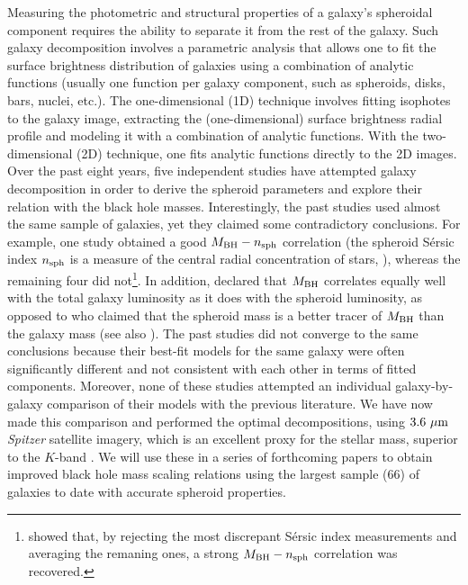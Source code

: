 \documentclass[preprint2]{emulateapj}
\begin{document}
Measuring the photometric and structural properties of a galaxy's spheroidal component 
requires the ability to separate it from the rest of the galaxy. 
Such galaxy decomposition involves a parametric analysis that allows one to fit the surface brightness distribution
of galaxies using a combination of analytic functions (usually one function per
galaxy component, such as spheroids, disks, bars, nuclei, etc.).
The one-dimensional (1D) technique involves fitting isophotes to the galaxy image, extracting the (one-dimensional) surface 
brightness radial profile and modeling it with a combination of analytic functions.
With the two-dimensional (2D) technique, one fits analytic functions directly to the 2D images. \\
Over the past eight years, five independent studies 
\citep{grahamdriver2007,sani2011,vika2012,beifiori2012,lasker2014data,lasker2014anal} have attempted galaxy decomposition
in order to derive the spheroid parameters and explore their relation with the black hole masses. 
Interestingly, the past studies used almost the same sample of galaxies, yet they claimed some contradictory conclusions.
For example, one study \citep{grahamdriver2007} obtained a good $M_{\rm BH}-n_{\rm sph}$ correlation 
(the spheroid S\'ersic index $n_{\rm sph}$ is a measure of the central radial concentration of stars, \citealt{trujillo2001}), 
whereas the remaining four did not\footnote{\cite{savorgnan2013} showed that, 
by rejecting the most discrepant S\'ersic index measurements and averaging the remaning ones, 
a strong $M_{\rm BH}-n_{\rm sph}$ correlation was recovered. }.
In addition, \cite{lasker2014anal} 
declared that $M_{\rm BH}$ correlates equally well with the total galaxy luminosity as it does with the spheroid luminosity, 
as opposed to \cite{beifiori2012} who claimed that the spheroid mass is a better tracer of $M_{\rm BH}$ than the galaxy mass 
(see also \citealt{kormendygebhardt2001,erwingadotti2012}).
The past studies did not converge to the same conclusions 
because their best-fit models for the same galaxy were often 
significantly different and not consistent with each other in terms of fitted components. 
Moreover, none of these studies attempted an individual galaxy-by-galaxy 
comparison of their models with the previous literature. 
We have now made this comparison and performed the optimal decompositions,
using $3.6~\rm \mu m$ \emph{Spitzer} satellite imagery, 
which is an excellent proxy for the stellar mass, superior to the $K$-band \citep{junim2008,sheth2010}.
We will use these in a series of forthcoming papers to obtain improved black hole mass scaling relations 
using the largest sample (66) of galaxies to date with accurate spheroid properties. \\
\end{document}
